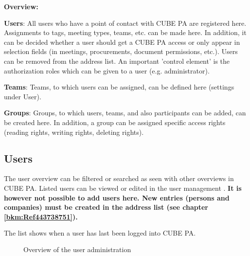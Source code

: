 \vspace{5cm}  

\textbf{Overview:}

\vspace{\baselineskip}

\textbf{Users}: All users who have a point of contact with CUBE PA are registered here. Assignments to tags, meeting types, teams, etc. can be made here. In addition, it can be decided whether a user should get a CUBE PA access or only appear in selection fields (in meetings, procurements, document permissions, etc.). Users can be removed from the address list. An important 'control element' is the authorization roles which can be given to a user (e.g. administrator).

\vspace{\baselineskip}

\textbf{Teams}: Teams, to which users can be assigned, can be defined here (settings under User).

\vspace{\baselineskip}

\textbf{Groups}: Groups, to which users, teams, and also participants can be added, can be created here. In addition, a group can be assigned specific access rights (reading rights, writing rights, deleting rights).

\subsection{Users}
\label{bkm:Ref445362390}

The user overview can be filtered or searched as seen with other overviews in CUBE PA. Listed users can be viewed or edited in the user management . \textbf{It is however not possible to add users here. New entries (persons and companies) must be created in the address list (see chapter \ref{bkm:Ref443738751}).} \\

\vspace{\baselineskip}

The list shows when a user has last been logged into CUBE PA.

\begin{figure}[H]
\caption{Overview of the user administration}
\end{figure}

